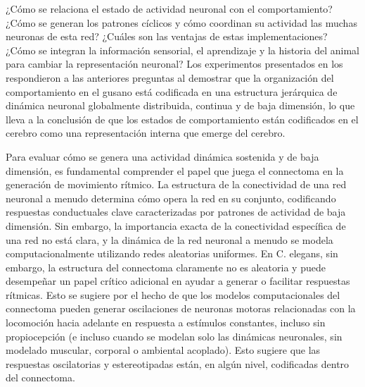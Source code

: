¿Cómo se relaciona el estado de actividad neuronal con el comportamiento? ¿Cómo se generan los patrones cíclicos y cómo coordinan su actividad las muchas neuronas de esta red? ¿Cuáles son las ventajas de estas implementaciones? ¿Cómo se integran la información sensorial, el aprendizaje y la historia del animal para cambiar la representación neuronal? Los experimentos presentados en los  respondieron a las anteriores preguntas al demostrar que la organización del comportamiento en el gusano está codificada en una estructura jerárquica de dinámica neuronal globalmente distribuida, continua y de baja dimensión, lo que lleva a la conclusión de que los estados de comportamiento están codificados en el cerebro como una representación interna que emerge del cerebro.

Para evaluar cómo se genera una actividad dinámica sostenida y de baja dimensión, es fundamental comprender el papel que juega el connectoma en la generación de movimiento rítmico. La estructura de la conectividad de una red neuronal a menudo determina cómo opera la red en su conjunto, codificando respuestas conductuales clave caracterizadas por patrones de actividad de baja dimensión. Sin embargo, la importancia exacta de la conectividad específica de una red no está clara, y la dinámica de la red neuronal a menudo se modela computacionalmente utilizando redes aleatorias uniformes. En C. elegans, sin embargo, la estructura del connectoma claramente no es aleatoria y puede desempeñar un papel crítico adicional en ayudar a generar o facilitar respuestas rítmicas. Esto se sugiere por el hecho de que los modelos computacionales del connectoma pueden generar oscilaciones de neuronas motoras relacionadas con la locomoción hacia adelante en respuesta a estímulos constantes, incluso sin propiocepción (e incluso cuando se modelan solo las dinámicas neuronales, sin modelado muscular, corporal o ambiental acoplado). Esto sugiere que las respuestas oscilatorias y estereotipadas están, en algún nivel, codificadas dentro del connectoma.


